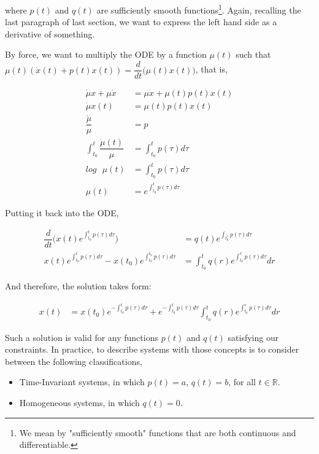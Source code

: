 \documentclass[12pt]{article}
\begin{document}
		where $p(t)$ and $q(t)$ are sufficiently smooth functions\footnote{We mean by "sufficiently smooth" functions that are both continuous and differentiable.}. Again, recalling the last paragraph of last section, we want to express the left hand side as a derivative of something. 
		
		By force, we want to multiply the ODE by a function $\mu(t)$ such that $\mu(t)(\dot{x}(t)+p(t)x(t)) = \dfrac{d}{dt}\biggr(\mu(t)x(t)\biggr)$, that is,
		
		\begin{align}
		\dot{\mu}x + \mu\dot{x} &= \mu\dot{x} + \mu(t)p(t)x(t)\\
		\dot{\mu}x(t) &= \mu(t)p(t)x(t)\\
		\dfrac{\dot{\mu}}{\mu} &= p\\
		\int_{t_{0}}^{t} \dfrac{\dot{\mu}(t)}{\mu} &= \int_{t_{0}}^{t} p(\tau)d\tau\\
		log\text{ }\mu(t) &= \int_{t_{0}}^{t} p(\tau)d\tau\\
		\mu(t) &= e^{\int_{t_{0}}^{t} p(\tau)d\tau}
		\end{align}
		
		Putting it back into the ODE,
		
		\begin{align}
		\dfrac{d}{dt}\biggr(x(t)e^{\int_{t_{0}}^{t}p(\tau)d\tau} \biggr) &= q(t)e^{\int_{t_{0}^{t}}p(\tau)d\tau }\\
		x(t)e^{\int_{t_{0}}^{t}p(\tau)d\tau} - x(t_{0})e^{\int_{t_{0}}^{t_{0}}p(\tau)d\tau} &= \int_{t_{0}}^{t}q(r)e^{\int_{t_{0}}^{r}p(\tau)d\tau}dr
		\end{align}
		
		And therefore, the solution takes form:
		
		\begin{align}
		x(t) &= x(t_{0})e^{-\int_{t_{0}}^{t}p(\tau)d\tau} + e^{-\int_{t_{0}}^{t}p(\tau)d\tau}\int_{t_{0}}^{t}q(r)e^{\int_{t_{0}}^{r}p(\tau)d\tau}dr
		\end{align}
		
		Such a solution is valid for any functions $p(t)$ and $q(t)$ satisfying our constraints. In practice, to describe systems with those concepts is to consider between the following classifications,
		
		\begin{itemize}
			\item Time-Invariant systems, in which $p(t) = a$, $q(t) = b$, for all $t \in \mathbb{R}$.
			\item Homogeneous systems, in which $q(t) = 0$.
		\end{itemize}
		
\end{document}
